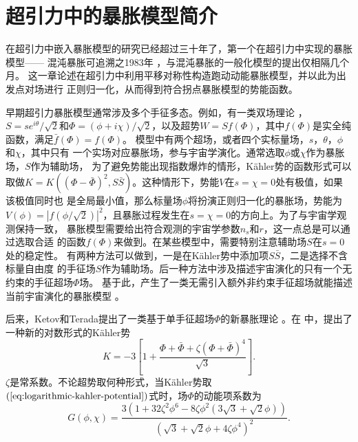 \section{超引力中的暴胀模型简介}
在超引力中嵌入暴胀模型的研究已经超过三十年了，第一个在超引力中实现的暴胀模型——
混沌暴胀可追溯之1983年
\citep{goncharov1984chaotic}，与混沌暴胀的一般化模型的提出仅相隔几个月。 
这一章论述在超引力中利用平移对称性构造跑动动能暴胀模型，并以此为出发点对场进行
正则归一化，从而得到符合拐点暴胀模型的势能函数。

早期超引力暴胀模型通常涉及多个手征多态。例如，有一类双场理论
\citep{kallosh2010new,kallosh2010new}，$S=s
e^{i\theta}/\sqrt{2}$和$\Phi=(\phi+i\chi)/\sqrt{2}$，以及超势$W=Sf(\Phi)$，其中$f(\Phi)$是实全纯函数，满足$\bar{f}(\Phi)=f(\Phi)$。
模型中有两个超场，或者四个实标量场，$s$，$\theta$，$\phi$和$\chi$，其中只有
一个实场对应暴胀场，参与宇宙学演化。通常选取$\phi$或$\chi$作为暴胀场，$S$作为辅助场，
为了避免势能出现指数爆炸的情形，K\"ahler势的函数形式可以取做$K=K({(\Phi-\bar{\Phi})}^2,S\bar{S})$。这种情形下，势能$V$在$s=\chi=0$处有极值，如果该极值同时也
是全局最小值，那么标量场$\phi$将扮演正则归一化的暴胀场，势能为$V(\phi)=|f(\phi/\sqrt{2})|^2$，且暴胀过程发生在$s=\chi=0$的方向上。为了与宇宙学观测保持一致，
暴胀模型需要给出符合观测的宇宙学参数$n_{s}$和$r$，这一点总是可以通过选取合适
的函数$f(\Phi)$来做到。在某些模型中，需要特别注意辅助场$S$在$s=0$处的稳定性。
有两种方法可以做到，一是在K\"ahler势中添加项$S\bar{S}$，二是选择不含标量自由度
的手征场$S$作为辅助场。后一种方法中涉及描述宇宙演化的只有一个无约束的手征超场$\Phi$场。
基于此，产生了一类无需引入额外非约束手征超场就能描述当前宇宙演化的暴胀模型
\citep{kallosh2015inflation,dall2014sgoldstino,linde2015does} 。

后来，Ketov和Terada提出了一类基于单手征超场$\Phi$的新暴胀理论
\citep{ketov2014generic,ketov2014inflation}。在 \citep{ketov2014generic}
中，提出了一种新的对数形式的K\"ahler势
\begin{equation}
  \label{eq:logarithmic-kahler-potential}
  K =
-3\left[1+\frac{\Phi+\bar{\Phi}+\zeta{\left(\Phi+\bar{\Phi}\right)}^{4}}{\sqrt{3}}\right].
\end{equation}
$\zeta$是常系数。不论超势取何种形式，当K\"ahler势取$(\ref{eq:logarithmic-kahler-potential})$式时，场$\Phi$的动能项系数为
\begin{equation}
  \label{eq:kinetic-coefficient-of-Phi}
  G(\phi,\chi) =
  \frac{3(1+32\zeta^2\phi^{6}-8\zeta\phi^2(3\sqrt{3}+\sqrt{2}\phi))}{{\left(\sqrt{3}+\sqrt{2}\phi+4\zeta\phi^{4}\right)}^2}.
\end{equation}

